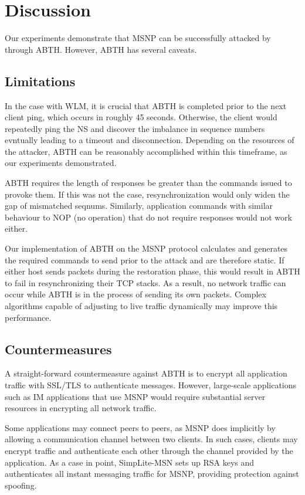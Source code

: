 \documentclass{sig-alternate}
\begin{document}
\section{Discussion}

Our experiments demonstrate that MSNP can be successfully attacked by through ABTH. However, ABTH has several caveats.

\subsection{Limitations}

In the case with WLM, it is crucial that ABTH is completed prior to the next client ping, which occurs in roughly 45 seconds.
Otherwise, the client would repeatedly ping the NS and discover the imbalance in sequence numbers evntually leading to a timeout and disconnection.
Depending on the resources of the attacker, ABTH can be reasonably accomplished within this timeframe, as our experiments demonstrated.

ABTH requires the length of responses be greater than the commands issued to provoke them.
If this was not the case, resynchronization would only widen the gap of mismatched seqnums.
Similarly, application commands with similar behaviour to NOP (no operation) that do not require responses would not work either.

Our implementation of ABTH on the MSNP protocol calculates and generates the required commands to send prior to the attack and are therefore static.
If either host sends packets during the restoration phase, this would result in ABTH to fail in resynchronizing their TCP stacks.
As a result, no network traffic can occur while ABTH is in the process of sending its own packets.
Complex algorithms capable of adjusting to live traffic dynamically may improve this performance.

\subsection{Countermeasures}

A straight-forward countermeasure against ABTH is to encrypt all application traffic with SSL/TLS to authenticate messages.
However, large-scale applications such as IM applications that use MSNP would require substantial server resources in encrypting all network traffic.

Some applications may connect peers to peers, as MSNP does implicitly by allowing a communication channel between two clients.
In such cases, clients may encrypt traffic and authenticate each other through the channel provided by the application.
As a case in point, SimpLite-MSN \cite{secway:url} sets up RSA keys and authenticates all instant messaging traffic for MSNP, providing protection against spoofing.
\end{document}
